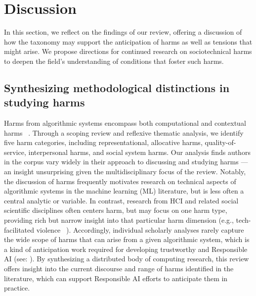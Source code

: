 \section{Discussion}
\label{discussion}
In this section, we reflect on the findings of our review, offering a discussion of how the taxonomy may support the anticipation of harms as well as tensions that might arise. We propose directions for continued research on sociotechnical harms to deepen the field’s understanding of conditions that foster such harms.

\subsection{Synthesizing methodological distinctions in studying harms}
Harms from algorithmic systems encompass both computational and contextual harms ~\cite{Boyarskaya_2020, Passi_Jackson_2018, Weinberg_2022, Saxena2020}. Through a scoping review and reflexive thematic analysis, we identify five harm categories, including representational, allocative harms, quality-of-service, interpersonal harms, and social system harms. Our analysis finds authors in the corpus vary widely in their approach to discussing and studying harms — an insight unsurprising given the multidisciplinary focus of the review. Notably, the discussion of harms frequently motivates research on technical aspects of algorithmic systems in the machine learning (ML) literature, but is less often a central analytic or variable. In contrast, research from HCI and related social scientific disciplines often centers harm, but may focus on one harm type, providing rich but narrow insight into that particular harm dimension (e.g., tech-facilitated violence ~\cite{Bailey_Henry_Flynn_2021, Dragiewicz_2018, Henry_Flynn_Powell_2020}). Accordingly, individual scholarly analyses rarely capture the wide scope of harms that can arise from a given algorithmic system, which is a kind of anticipation work required for developing trustworthy and Responsible AI (see: \cite{schwartz2022towards}). 
By synthesizing a distributed body of computing research, this review offers insight into the current discourse and range of harms identified in the literature, which can support Responsible AI efforts to anticipate them in practice. 

